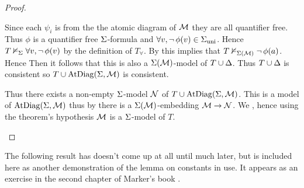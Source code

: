 \begin{proof}
\begin{backward}
        Since each $\psi_i$ is from the the atomic diagram of $\mathcal{M}$ 
        they are all quantifier free.
        Thus $\phi$ is a quantifier free $\Sigma$-formula and 
        $\forall v,  \neg\, \phi(v) \in {\Sigma}_\mathrm{uni}$.
        Hence $T \nvDash_{\Sigma} \forall v, \neg\, \phi(v)$ 
        by the definition of $T_\forall$.
        By 
        this implies that $T \nvDash_{\Sigma(\mathcal{M})} \neg\, \phi(a)$.
        Hence  
        Then it follows that this is also a $\Sigma(\mathcal{M})$-model of $T \cup \Delta$.
        Thus $T \cup \Delta$ is consistent so
        $T \cup \mathrm{AtDiag}(\Sigma,\mathcal{M})$ is consistent.

        Thus there exists a non-empty $\Sigma$-model $\mathcal{N}$ of 
        $T \cup \mathrm{AtDiag}(\Sigma,\mathcal{M})$.
        This is a model of $\mathrm{AtDiag}(\Sigma,\mathcal{M})$ thus by 
        there is a $\Sigma(\mathcal{M})$-embedding $\mathcal{M} \to \mathcal{N}$.
        We , 
        hence using the theorem's hypothesis $\mathcal{M}$ is a $\Sigma$-model of $T$.
    \end{backward}
\end{proof}

The following result has doesn't come up at all until much later,
but is included here as another demonstration of the lemma on constants in use.
It appears as an exercise in the second chapter of Marker's book \cite{marker}.

